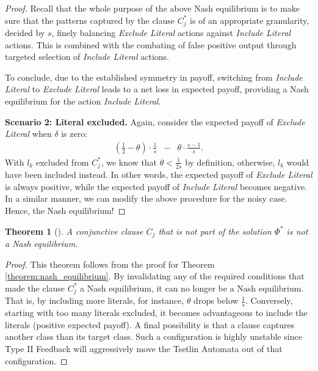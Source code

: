 \documentclass[11pt,a4paper]{article}
\newtheorem{mytheorem}{Theorem}
\begin{document}
\begin{proof}
Recall that the whole purpose of the above Nash equilibrium is to make sure that the patterns captured by the clause $C^*_j$ is of an appropriate granularity, decided by $s$, finely balancing \emph{Exclude Literal} actions against \emph{Include Literal} actions. This is combined with the combating of false positive output through targeted selection of \emph{Include Literal} actions.

To conclude, due to the established symmetry in payoff, switching from \emph{Include Literal} to \emph{Exclude Literal} leads to a net loss in expected payoff, providing a Nash equilibrium for the action \emph{Include Literal}.

{\bf Scenario 2: Literal excluded.} Again, consider the expected payoff of \emph{Exclude Literal} when $\delta$ is zero:
\begin{eqnarray}
\left(\frac{1}{2} - \theta\right) \cdot \frac{1}{s} 
 &-& \theta \cdot \frac{s-1}{s}.
\end{eqnarray}
With $l_k$ excluded from $C^*_j$, we know that $\theta < \frac{1}{2s}$ by definition, otherwise, $l_k$ would have been included instead. In other words, the expected payoff of \emph{Exclude Literal} is always positive, while the expected payoff of \emph{Include Literal} becomes negative. In a similar manner, we can modify the above procedure for the noisy case. Hence, the Nash equilibrium!
\end{proof}

\begin{mytheorem}[]A conjunctive clause $C_j$ that is not part of the solution $\Phi^*$ is not a Nash equilibrium.\label{nash_equilibrium}
\end{mytheorem}
\begin{proof}
This theorem follows from the proof for Theorem \ref{theorem:nash_equilibrium}. By invalidating any of the required conditions that made the clause $C^*_j$ a Nash equilibrium, it can no longer be a Nash equilibrium. That is, by including more literals, for instance, $\theta$ drops below $\frac{1}{s}$. Conversely, starting with too many literals excluded,  it becomes advantageous to include the literals (positive expected payoff). A final possibility is that a clause captures another class than its target class. Such a configuration is highly unstable since Type II Feedback will aggressively move the Tsetlin Automata out of that configuration.
\end{proof}
\end{document}
